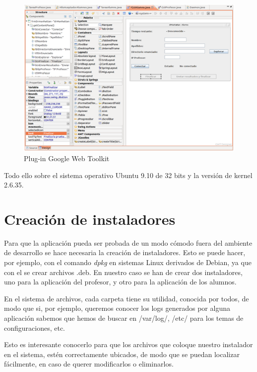 \begin{figure}[width=3cm]%
    \centering
    \includegraphics{implementacion/GWT2}
    \caption{Plug-in Google Web Toolkit}
    \label{fig:implementacion:GWT}
\end{figure}


Todo ello sobre el sistema operativo Ubuntu 9.10 de 32 bits y la versión de kernel 2.6.35.

\section{Creación de instaladores}
\label{sec:implementacion:instaladores}

Para que la aplicación pueda ser probada de un modo cómodo fuera del ambiente de desarrollo se hace necesaria la creación de instaladores. Esto se puede hacer, por ejemplo, con el comando \emph{dpkg} en sistemas Linux derivados de Debian, ya que con el se crear archivos .deb. En nuestro caso se han de crear dos instaladores, uno para la aplicación del profesor, y otro para la aplicación de los alumnos.
\newline

En el sistema de archivos, cada carpeta tiene su utilidad, conocida por todos, de modo que si, por ejemplo, queremos conocer los logs generados por alguna aplicación sabemos que hemos de buscar en /var/log/, /etc/ para los temas de configuraciones, etc.
\newline

Esto es interesante conocerlo para que los archivos que coloque nuestro instalador en el sistema, estén correctamente ubicados, de modo que se puedan localizar fácilmente, en caso de querer modificarlos o eliminarlos.
\newline


